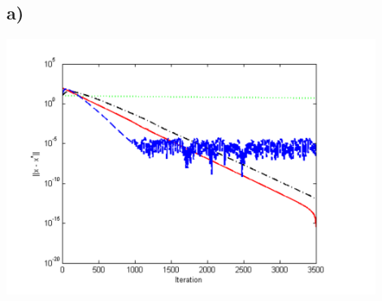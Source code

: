 \documentclass[a4paper]{article}
\begin{document}
    \subsection*{a)}
        \begin{center}
            \includegraphics[width=120mm]{Assignment 8/A8_3_a.png}
        \end{center}
\end{document}
